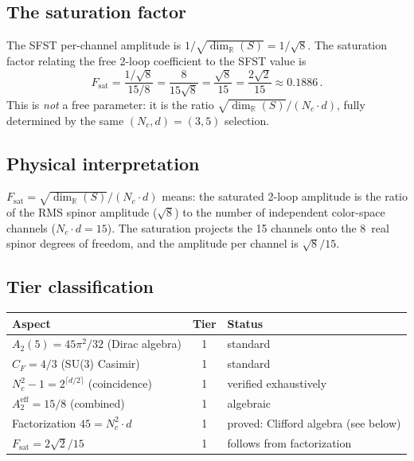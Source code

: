 \documentclass[11pt,a4paper]{article}
\begin{document}
\subsection{The saturation factor}

The SFST per-channel amplitude is $1/\sqrt{\dim_\mathbb{R}(S)}=1/\sqrt{8}$.
The saturation factor relating the free 2-loop coefficient to the
SFST value is
\[
  F_{\mathrm{sat}} = \frac{1/\sqrt{8}}{15/8}
  = \frac{8}{15\sqrt{8}}
  = \frac{\sqrt{8}}{15}
  = \frac{2\sqrt{2}}{15}\approx 0.1886\,.
\]
This is \emph{not} a free parameter: it is the ratio
$\sqrt{\dim_\mathbb{R}(S)}/(N_c\cdot d)$, fully determined by the
same $(N_c,d)=(3,5)$ selection.

\subsection{Physical interpretation}

$F_{\mathrm{sat}}=\sqrt{\dim_\mathbb{R}(S)}/(N_c\cdot d)$ means: the
saturated 2-loop amplitude is the ratio of the RMS spinor amplitude
($\sqrt{8}$) to the number of independent color-space channels
($N_c\cdot d=15$).  The saturation projects the 15 channels onto the
8~real spinor degrees of freedom, and the amplitude per channel is
$\sqrt{8}/15$.

\subsection{Tier classification}

\begin{center}
\renewcommand{\arraystretch}{1.2}
\begin{tabular}{p{}cp{}}
\toprule
Aspect & Tier & Status\\
\midrule
$A_2(5)=45\pi^2/32$ (Dirac algebra) & 1 & standard\\
$C_F=4/3$ (SU(3) Casimir) & 1 & standard\\
$N_c^2-1=2^{\lceil d/2\rceil}$ (coincidence) & 1 & verified exhaustively\\
$A_2^{\mathrm{eff}}=15/8$ (combined) & 1 & algebraic\\
Factorization $45=N_c^2\cdot d$ & 1 & proved: Clifford algebra
  (see below)\\
$F_{\mathrm{sat}}=2\sqrt{2}/15$ & 1 & follows from factorization\\
\bottomrule
\end{tabular}
\end{center}
\end{document}
